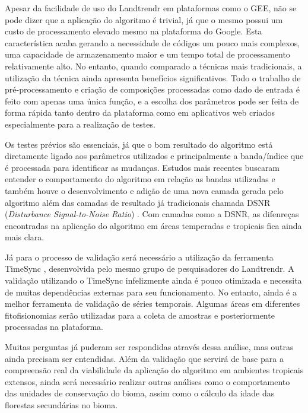 Apesar da facilidade de uso do Landtrendr em plataformas como o GEE, não se pode dizer que a aplicação do algoritmo é trivial, já que o mesmo possui um custo de processamento elevado mesmo na plataforma do Google. Esta característica acaba gerando a necessidade de códigos um pouco mais complexos, uma capacidade de armazenamento maior e um tempo total de processamento relativamente alto. No entanto, quando comparado a técnicas mais tradicionais, a utilização da técnica ainda apresenta benefícios significativos. Todo o trabalho de pré-processamento e criação de composições processadas como dado de entrada é feito com apenas uma única função, e a escolha dos parâmetros pode ser feita de forma rápida tanto dentro da plataforma como em aplicativos web criados especialmente para a realização de testes. 

Os testes prévios são essenciais, já que o bom resultado do algoritmo está diretamente ligado aos parâmetros utilizados e principalmente a banda/índice que é processada para identificar as mudanças. Estudos mais recentes buscaram entender o comportamento do algoritmo em relação as bandas utilizadas e também houve o desenvolvimento e adição de uma nova camada gerada pelo algoritmo além das camadas de resultado já tradicionais chamada DSNR (\textit{Disturbance Signal-to-Noise Ratio}) \citep{COHEN2018131}. Com camadas como a DSNR, as difenreças encontradas na aplicação do algoritmo em áreas temperadas e tropicais fica ainda mais clara. 

Já para o processo de validação será necessário a utilização da ferramenta TimeSync \citep{COHEN20102911}, desenvolvida pelo mesmo grupo de pesquisadores do Landtrendr. A validação utilizando o TimeSync infelizmente ainda é pouco otimizada e necessita de muitas dependências externas para seu funcionamento. No entanto, ainda é a melhor ferramenta de validação de séries temporais. Algumas áreas em diferentes fitofisionomias serão utilizadas para a coleta de amostras e posteriormente processadas na plataforma.

Muitas perguntas já puderam ser respondidas através dessa análise, mas outras ainda precisam ser entendidas. Além da validação que servirá de base para a compreensão real da viabilidade da aplicação do algoritmo em ambientes tropicais extensos, ainda será necessário realizar outras análises como o comportamento das unidades de conservação do bioma, assim como o cálculo da idade das florestas secundárias no bioma. 